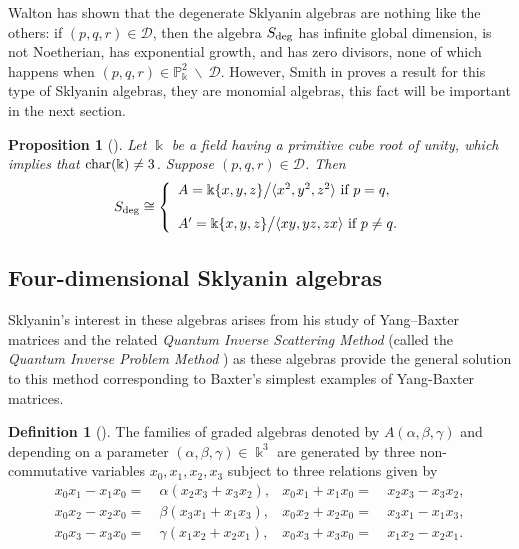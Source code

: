 \documentclass{amsart}
\newtheorem{proposition}[theorem]{Proposition}
\theoremstyle{definition}
\newtheorem{definition}[theorem]{Definition}
\theoremstyle{remark}
\numberwithin{equation}{section}
\begin{document}
Walton \cite{Walton2009} has shown that the degenerate Sklyanin algebras are nothing like the others: if $(p,q,r) \in \mathcal{D}$, then the algebra $S_{{\rm deg}}$  has infinite global dimension, is not Noetherian, has exponential growth, and has zero divisors, none of which happens when $(p,q,r)\in \mathbb{P}^2_\Bbbk\ \backslash\ \mathcal{D}$. However, Smith in \cite{Smith2012} proves a result for this type of Sklyanin algebras, they are monomial algebras, this fact will be important in the next section. 

\begin{proposition}[{\cite[Theorem 2.1]{Smith2012}}] \label{MonomialAlgebra} 
Let $\Bbbk$ be a field having a primitive cube root of unity, which implies that ${\rm char}(\Bbbk) \neq3$. Suppose $(p,q,r)\in \mathcal{D}$. Then
 \begin{equation*}
            S_{\rm deg}\cong\left\{ \begin{array}{lcc}
             A=\Bbbk\{ x,y,z\}\big/\langle x^2,y^2,z^2\rangle \ \text{if}~ p=q,\\
    \\ A'=\Bbbk\{ x,y,z\}\big/\langle xy,yz,zx\rangle \ \text{if} \ p\neq q.
             \end{array}
   \right.
\end{equation*}
\end{proposition}

\subsection{Four-dimensional Sklyanin algebras}\label{fourSkly}

Sklyanin's interest in these algebras arises from his study of Yang–Baxter matrices and the related {\em Quantum Inverse Scattering Method} (called the {\em Quantum Inverse Problem Method} \cite{Sklyanin1982, Sklyanin1983}) as these algebras provide the general solution to this method corresponding to Baxter's simplest examples of Yang-Baxter matrices.

\begin{definition}[{\cite[p. 746]{ChirvasituSmith2023}}] 
The families of graded algebras denoted by $A(\alpha,\beta,\gamma)$ and depending on a parameter $(\alpha,\beta,\gamma)\in\Bbbk^3$ are generated by three non-commutative variables  $x_0,x_1,x_2,x_3$ subject to three relations given by
\begin{align}\label{FDSAdefinition}
    x_0 x_1  - x_1 x_0 = &\  \alpha(x_2x_3 + x_3x_2), & x_0x_1 + x_1x_0 = &\ x_2x_3 - x_3x_2,\\
    x_0 x_2  - x_2 x_0 = &\  \beta(x_3x_1 + x_1x_3), & x_0x_2 + x_2x_0 = &\ x_3x_1 - x_1x_3,\\
    x_0 x_3  - x_3 x_0 = &\  \gamma(x_1x_2 + x_2x_1), & x_0x_3 + x_3x_0 = &\ x_1x_2 - x_2x_1.
\end{align}
\end{definition}
\end{document}
